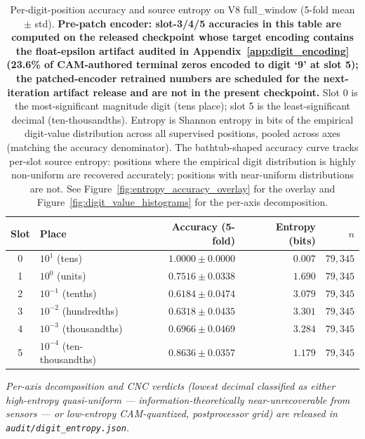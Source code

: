 \begin{table}[ht]
\centering
\caption{Per-digit-position accuracy and source entropy on V8 full\_window (5-fold mean $\pm$ std). \textbf{Pre-patch encoder: slot-3/4/5 accuracies in this table are computed on the released checkpoint whose target encoding contains the float-epsilon artifact audited in Appendix~\ref{app:digit_encoding} (23.6\% of CAM-authored terminal zeros encoded to digit `9' at slot 5); the patched-encoder retrained numbers are scheduled for the next-iteration artifact release and are not in the present checkpoint.} Slot 0 is the most-significant magnitude digit (tens place); slot 5 is the least-significant decimal (ten-thousandths). Entropy is Shannon entropy in bits of the empirical digit-value distribution across all supervised positions, pooled across axes (matching the accuracy denominator). The bathtub-shaped accuracy curve tracks per-slot source entropy: positions where the empirical digit distribution is highly non-uniform are recovered accurately; positions with near-uniform distributions are not. See Figure~\ref{fig:entropy_accuracy_overlay} for the overlay and Figure~\ref{fig:digit_value_histograms} for the per-axis decomposition.}
\label{tab:per_digit_position}
\begin{tabular}{c l r r r}
\toprule
Slot & Place & Accuracy (5-fold) & Entropy (bits) & $n$ \\
\midrule
0 & $10^{1}$ (tens) & $1.0000 \pm 0.0000$ & $0.007$ & $79,345$ \\
1 & $10^{0}$ (units) & $0.7516 \pm 0.0338$ & $1.690$ & $79,345$ \\
2 & $10^{-1}$ (tenths) & $0.6184 \pm 0.0474$ & $3.079$ & $79,345$ \\
3 & $10^{-2}$ (hundredths) & $0.6318 \pm 0.0435$ & $3.301$ & $79,345$ \\
4 & $10^{-3}$ (thousandths) & $0.6966 \pm 0.0469$ & $3.284$ & $79,345$ \\
5 & $10^{-4}$ (ten-thousandths) & $0.8636 \pm 0.0357$ & $1.179$ & $79,345$ \\
\bottomrule
\end{tabular}
\par\smallskip
\footnotesize\textit{Per-axis decomposition and CNC verdicts (lowest decimal classified as either \emph{high-entropy quasi-uniform} --- information-theoretically near-unrecoverable from sensors --- or \emph{low-entropy CAM-quantized}, postprocessor grid) are released in \texttt{audit/digit\_entropy.json}.}
\end{table}
